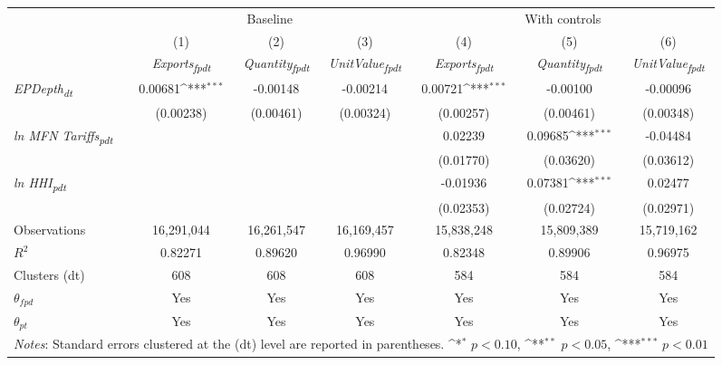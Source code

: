 {
\def\sym#1{\ifmmode^{#1}\else\(^{#1}\)\fi}
\begin{tabular}{l*{6}{c}}
\toprule
&\multicolumn{3}{c}{Baseline}&\multicolumn{3}{c}{With controls}\\\cmidrule(lr){2-4}\cmidrule(lr){5-7}
&(1)&(2)&(3)&(4)&(5)&(6)\\
&\textit{Exports\textsubscript{fpdt}}&\textit{Quantity\textsubscript{fpdt}}&\textit{UnitValue\textsubscript{fpdt}}&\textit{Exports\textsubscript{fpdt}}&\textit{Quantity\textsubscript{fpdt}}&\textit{UnitValue\textsubscript{fpdt}}\\
\midrule
\textit{EPDepth\textsubscript{dt}} & 0.00681\sym{***} & -0.00148 & -0.00214 & 0.00721\sym{***} & -0.00100 & -0.00096\\
 & (0.00238) & (0.00461) & (0.00324) & (0.00257) & (0.00461) & (0.00348)\\
\addlinespace
\textit{ln MFN Tariffs\textsubscript{pdt}} &  &  &  & 0.02239 & 0.09685\sym{***} & -0.04484\\
 &  &  &  & (0.01770) & (0.03620) & (0.03612)\\
\addlinespace
\textit{ln HHI\textsubscript{pdt}} &  &  &  & -0.01936 & 0.07381\sym{***} & 0.02477\\
 &  &  &  & (0.02353) & (0.02724) & (0.02971)\\
\midrule
Observations & 16,291,044 & 16,261,547 & 16,169,457 & 15,838,248 & 15,809,389 & 15,719,162\\
$R^{2}$ & 0.82271 & 0.89620 & 0.96990 & 0.82348 & 0.89906 & 0.96975\\
Clusters (dt) & 608 & 608 & 608 & 584 & 584 & 584\\
$\theta_{fpd}$ & Yes & Yes & Yes & Yes & Yes & Yes\\
$\theta_{pt}$ & Yes & Yes & Yes & Yes & Yes & Yes\\
\bottomrule
\multicolumn{7}{l}{\footnotesize \textit{Notes}: Standard errors clustered at the (dt) level are reported in parentheses. \sym{*} \(p<0.10\), \sym{**} \(p<0.05\), \sym{***} \(p<0.01\)}\\
\end{tabular}
}
